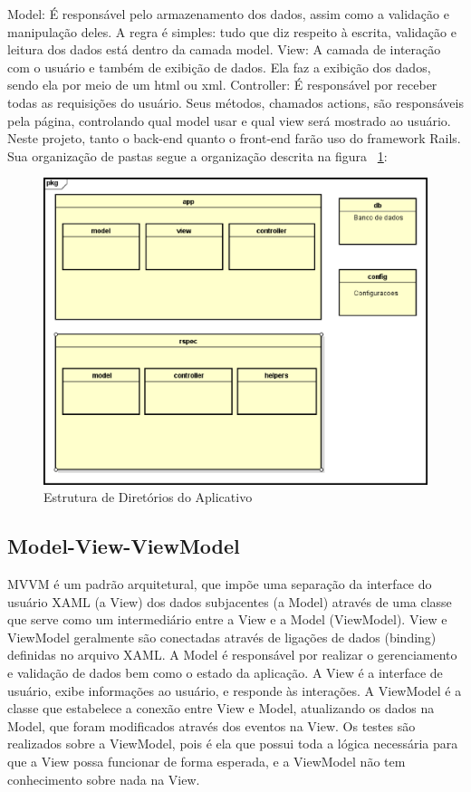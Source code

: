 Model: É responsável pelo armazenamento dos dados, assim como a  validação e manipulação deles. A regra é simples: tudo que diz respeito à escrita, validação e leitura dos dados está dentro da camada model.
View: A camada de interação com o usuário e também de exibição de dados. Ela faz a  exibição dos dados, sendo ela por meio de um html ou xml.
Controller: É responsável por receber todas as requisições do usuário. Seus métodos, chamados actions, são responsáveis pela página, controlando qual model usar e qual view será mostrado ao usuário.
Neste projeto, tanto o back-end quanto o front-end farão uso do framework Rails. Sua organização de pastas segue a organização descrita na figura ~\ref{fig:pastas}:

\begin{figure}[!h]
  \centering
  \includegraphics[keepaspectratio=true,scale=0.4]{figuras/pastas.eps}
  \caption{Estrutura de Diretórios do Aplicativo}
  \label{fig:pastas}
\end{figure}

\subsection{Model-View-ViewModel}

MVVM é um padrão arquitetural, que impõe uma separação da interface do usuário XAML (a View) dos dados subjacentes (a Model) através de uma classe que serve como um intermediário entre a View e a Model (ViewModel). View e ViewModel geralmente são conectadas através de ligações de dados (binding) definidas no arquivo XAML.
A Model é responsável por realizar o gerenciamento e validação de dados bem como o estado da aplicação.
A View é a interface de usuário, exibe informações ao usuário, e responde às interações.
A ViewModel é a classe que estabelece a conexão entre View e Model, atualizando os dados na Model, que foram modificados através dos eventos na View.
Os testes são realizados sobre a ViewModel, pois é ela que possui toda a lógica necessária para que a View possa funcionar de forma esperada, e a ViewModel não tem conhecimento sobre nada na View.


